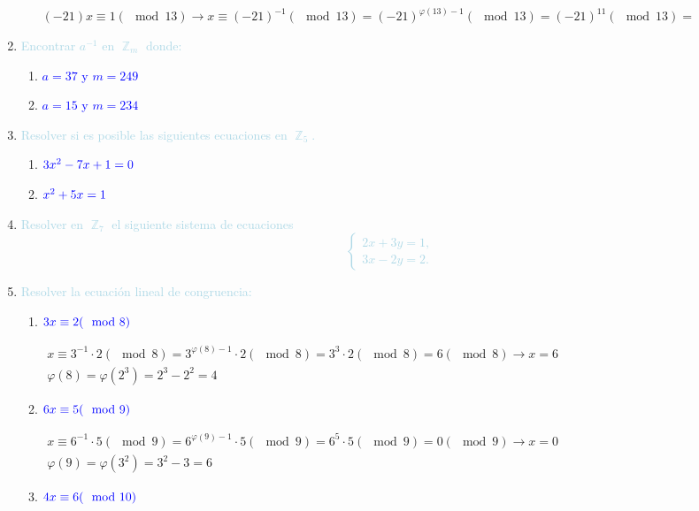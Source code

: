 \documentclass[12pt]{article}
\newcommand{\lb}[1]{\textcolor{lightblue}{#1}}
\newcommand{\db}[1]{\textcolor{blue}{#1}}
\DeclareMathOperator{\Z}{\mathbb{Z}}
\begin{document}
\begin{enumerate}[label=\color{red}\textbf{\arabic*)}, leftmargin=*]
\begin{enumerate}[label=\color{red}\alph*)]
		$(-21)x\equiv1(\mod13)\longrightarrow x\equiv(-21)^{-1}(\mod13)=(-21)^{\varphi(13)-1}(\mod13)=(-21)^{11}(\mod13)=$
	\end{enumerate}
	\item \lb{Encontrar $a^{-1}$ en $\Z_m$ donde:}
	\begin{enumerate}[label=\color{red}\alph*)]
		\item \db{$a=37$ y $m=249$}
		\item \db{$a=15$ y $m=234$}
	\end{enumerate}
	\item \lb{Resolver si es posible las siguientes ecuaciones en $\Z_5$.}
	\begin{enumerate}[label=\color{red}\alph*)]
		\item $\db{3x^2-7x+1=0}$
		\item $\db{x^2+5x=1}$
	\end{enumerate}
	
	\item \lb{Resolver en $\Z_7$ el siguiente sistema de ecuaciones \[ \begin{cases}
			2x+3y=1,\\
			3x-2y=2.
		\end{cases} \]}
	\item \lb{Resolver la ecuación lineal de congruencia:}
	\begin{enumerate}[label=\color{red}\alph*)]
		\item $\db{3x\equiv2(\mod 8)}$
		
		$\begin{array}{l}
			x\equiv3^{-1}\cdot2(\mod8)=3^{\varphi(8)-1}\cdot2(\mod8)=3^3\cdot2(\mod8)=6(\mod8)\longrightarrow x=6\\
			\varphi(8)=\varphi(2^3)=2^3-2^2=4
		\end{array}$
		
		\item $\db{6x\equiv 5(\mod 9)}$
		
		$\begin{array}{l}
			x\equiv6^{-1}\cdot5(\mod9)=6^{\varphi(9)-1}\cdot5(\mod9)=6^5\cdot5(\mod9)=0(\mod9)\longrightarrow x=0\\
			\varphi(9)=\varphi(3^2)=3^2-3=6
		\end{array}$
		\item $\db{4x\equiv6(\mod 10)}$
		

\end{enumerate}
\end{enumerate}
\end{document}
